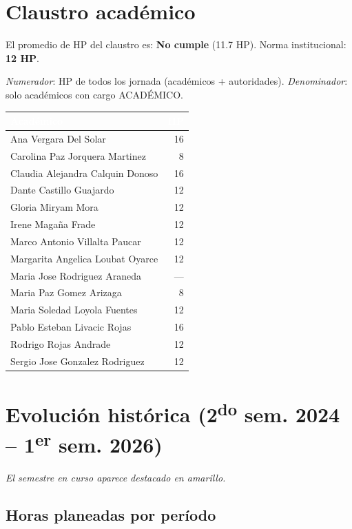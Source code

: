 \documentclass[11pt, a4paper]{article}
\begin{document}
\section{Claustro académico}

El promedio de HP del claustro es: \textcolor{red!70!black}{\textbf{No cumple}} (11.7 HP). Norma institucional: \textbf{12 HP}.

\textit{Numerador}: HP de todos los jornada (académicos + autoridades). \textit{Denominador}: solo académicos con cargo ACADÉMICO.

\begin{tabular}{lr}
\toprule
\rowcolor{usachDark} \textbf{\textcolor{white}{Académico}} & \textbf{\textcolor{white}{HP}} \\
\midrule
Ana Vergara Del Solar & 16 \\
\rowcolor{rowEven}Carolina Paz Jorquera Martinez & 8 \\
Claudia Alejandra Calquin Donoso & 16 \\
\rowcolor{rowEven}Dante Castillo Guajardo & 12 \\
Gloria Miryam Mora & 12 \\
\rowcolor{rowEven}Irene Magaña Frade & 12 \\
Marco Antonio Villalta Paucar & 12 \\
\rowcolor{rowEven}Margarita Angelica Loubat Oyarce & 12 \\
Maria Jose Rodriguez Araneda & --- \\
\rowcolor{rowEven}Maria Paz Gomez Arizaga & 8 \\
Maria Soledad Loyola Fuentes & 12 \\
\rowcolor{rowEven}Pablo Esteban Livacic Rojas & 16 \\
Rodrigo Rojas Andrade & 12 \\
\rowcolor{rowEven}Sergio Jose Gonzalez Rodriguez & 12 \\
\bottomrule
\end{tabular}

\section{Evolución histórica (2\textsuperscript{do} sem. 2024 -- 1\textsuperscript{er} sem. 2026)}

\textit{El semestre en curso aparece destacado en amarillo.}

\subsection{Horas planeadas por período}
\end{document}
